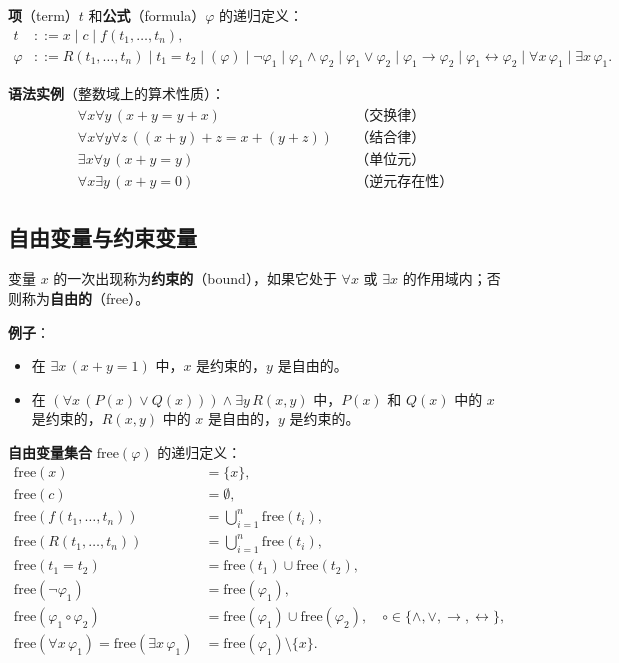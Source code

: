 \documentclass[UTF8,11pt,a4paper]{ctexbook}   %
\theoremstyle{definition}
\begin{document}
\textbf{项}（term）$t$ 和\textbf{公式}（formula）$\varphi$ 的递归定义：
\[
\begin{aligned}
t &::= x \mid c \mid f(t_1,\ldots,t_n),\\
\varphi &::= R(t_1,\ldots,t_n) \mid t_1=t_2 \mid (\varphi) \mid \neg\varphi_1 \mid \varphi_1\land\varphi_2 \mid \varphi_1\lor\varphi_2 \mid \varphi_1\to\varphi_2 \mid \varphi_1\leftrightarrow\varphi_2 \mid \forall x\,\varphi_1 \mid \exists x\,\varphi_1.
\end{aligned}
\]

\textbf{语法实例}（整数域上的算术性质）：
\[
\begin{aligned}
&\forall x\forall y\,(x+y=y+x) && \text{（交换律）}\\
&\forall x\forall y\forall z\,((x+y)+z=x+(y+z)) && \text{（结合律）}\\
&\exists x\forall y\,(x+y=y) && \text{（单位元）}\\
&\forall x\exists y\,(x+y=0) && \text{（逆元存在性）}
\end{aligned}
\]

\subsection{自由变量与约束变量}

变量 $x$ 的一次出现称为\textbf{约束的}（bound），如果它处于 $\forall x$ 或 $\exists x$ 的作用域内；否则称为\textbf{自由的}（free）。

\textbf{例子}：
\begin{itemize}
    \item 在 $\exists x\,(x+y=1)$ 中，$x$ 是约束的，$y$ 是自由的。
    \item 在 $(\forall x\,(P(x)\lor Q(x)))\land\exists y\,R(x,y)$ 中，$P(x)$ 和 $Q(x)$ 中的 $x$ 是约束的，$R(x,y)$ 中的 $x$ 是自由的，$y$ 是约束的。
\end{itemize}

\textbf{自由变量集合} $\mathrm{free}(\varphi)$ 的递归定义：
\[
\begin{aligned}
\mathrm{free}(x) &= \{x\},\\
\mathrm{free}(c) &= \emptyset,\\
\mathrm{free}(f(t_1,\ldots,t_n)) &= \bigcup_{i=1}^n\mathrm{free}(t_i),\\
\mathrm{free}(R(t_1,\ldots,t_n)) &= \bigcup_{i=1}^n\mathrm{free}(t_i),\\
\mathrm{free}(t_1=t_2) &= \mathrm{free}(t_1)\cup\mathrm{free}(t_2),\\
\mathrm{free}(\neg\varphi_1) &= \mathrm{free}(\varphi_1),\\
\mathrm{free}(\varphi_1\circ\varphi_2) &= \mathrm{free}(\varphi_1)\cup\mathrm{free}(\varphi_2),\quad \circ\in\{\land,\lor,\to,\leftrightarrow\},\\
\mathrm{free}(\forall x\,\varphi_1) = \mathrm{free}(\exists x\,\varphi_1) &= \mathrm{free}(\varphi_1)\setminus\{x\}.
\end{aligned}
\]
\end{document}
